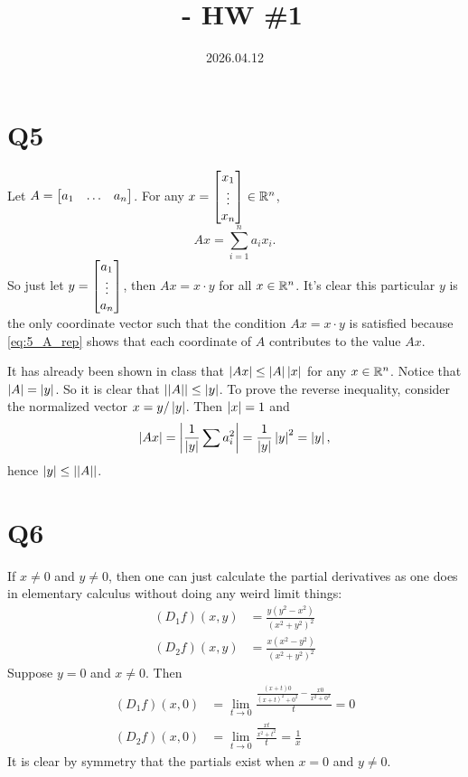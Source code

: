\documentclass[12pt]{article}
\title{\course\ - HW \#1}
\author{\myname}
\date{2026.04.12}
\begin{document}
\maketitle
\thispagestyle{fancy}


\section*{Q5}
Let $A = \begin{bmatrix}a_1 & \ldots & a_n\end{bmatrix}$. 
For any $x = \begin{bmatrix}x_1 \\ \vdots \\ x_n\end{bmatrix} \in \mathbb{R}^n$, 
\begin{equation} \label{eq:5_A_rep}
  Ax = \sum_{i = 1}^{n} {a_i x_i}.
\end{equation}
So just let $y = \begin{bmatrix}a_1 \\ \vdots \\ a_n\end{bmatrix}$, then $Ax = x \cdot y$ for all $x \in \mathbb{R}^n$. 
It's clear this particular $y$ is the only coordinate vector such that the condition $Ax = x \cdot y$ is satisfied because \eqref{eq:5_A_rep} shows that each coordinate of $A$ contributes to the value $Ax$. 

It has already been shown in class that $\left|Ax\right| \leq \left|A\right| \left|x\right|$ for any $x \in \mathbb{R}^n$. 
Notice that $\left|A\right| = \left|y\right|$. 
So it is clear that $\left|\left|A\right|\right| \leq \left|y\right|$. 
To prove the reverse inequality, consider the normalized vector $x = y / \left|y\right|$. 
Then $\left|x\right| = 1$ and 
$$\left|Ax\right| = \left|\frac{1}{\left|y\right|} \sum a_{i}^{2}\right| = \frac{1}{\left|y\right|}\left|y\right|^2 = \left|y\right|,$$
hence $\left|y\right| \leq \left|\left|A\right|\right|$.  

\section*{Q6} 
If $x \neq 0$ and $y \neq 0$, then one can just calculate the partial derivatives as one does in elementary calculus without doing any weird limit things: 
\begin{align*}
  (D_1 f)(x, y) & = \frac{y(y^2 - x^2)}{(x^2 + y^2)^2} \\ 
  (D_2 f)(x, y) & = \frac{x(x^2 - y^2)}{(x^2 + y^2)^2}
\end{align*}
Suppose $y = 0$ and $x \neq 0$.  
Then 
\begin{align*}
  (D_1 f)(x, 0) & = \lim_{t \rightarrow 0} \frac{\frac{(x + t)0}{(x + t)^2 + 0^2} - \frac{x0}{x^2 + 0^2}}{t} = 0 \\ 
  (D_2 f)(x, 0) & = \lim_{t \rightarrow 0} \frac{\frac{xt}{x^2 + t^2}}{t} = \frac{1}{x}
\end{align*}
It is clear by symmetry that the partials exist when $x = 0$ and $y \neq 0$. 
\end{document}
